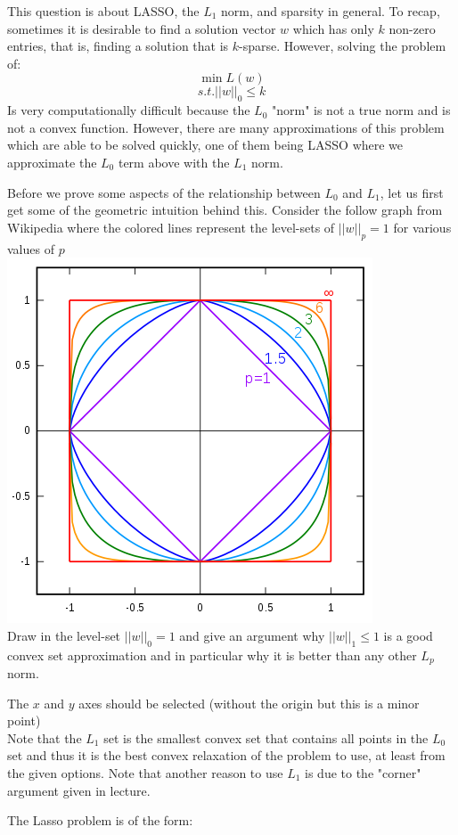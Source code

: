 
This question is about LASSO, the $L_1$ norm, and sparsity in general. To recap, sometimes it is desirable to find a solution vector $w$ which has only $k$ non-zero entries, that is, finding a solution that is $k$-sparse. However, solving the problem of:
$$\min L(w)$$
$$s.t. ||w||_0 \leq k$$
Is very computationally difficult because the $L_0$ "norm" is not a true norm and is not a convex function. However, there are many approximations of this problem which are able to be solved quickly, one of them being LASSO where we approximate the $L_0$ term above with the $L_1$ norm.

\begin{Parts}

\Part Before we prove some aspects of the relationship between $L_0$ and $L_1$, let us first get some of the geometric intuition behind this. Consider the follow graph from Wikipedia where the colored lines represent the level-sets of $||w||_p = 1$ for various values of $p$ \\
\includegraphics[scale=.5]{src/gs/pic.png}
\\
Draw in the level-set $||w||_0 = 1$ and give an argument why $||w||_1 \leq 1$ is a good convex set approximation and in particular why it is better than any other $L_p$ norm.
\begin{solution}
The $x$ and $y$ axes should be selected (without the origin but this is a minor point)\\
Note that the $L_1$ set is the smallest convex set that contains all points in the $L_0$ set and thus it is the best convex relaxation of the problem to use, at least from the given options. Note that another reason to use $L_1$ is due to the "corner" argument given in lecture.
\end{solution}
\Part The Lasso problem is of the form:  


\end{Parts}
